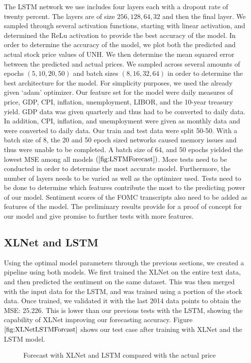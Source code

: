 \documentclass{article}
\begin{document}
The LSTM network we use includes four layers each with a dropout rate of twenty percent. The layers are of size $256,128,64,32$ and then the final layer. We sampled through several activation functions, starting with linear activation, and determined the ReLu activation to provide the best accuracy of the model. In order to determine the accuracy of the model, we plot both the predicted and actual stock price values of UNH. We then determine the mean squared error between the predicted and actual prices. We sampled across several amounts of epochs $(5,10,20,50)$ and batch sizes $(8,16,32, 64)$ in order to determine the best architecture for the model. For simplicity purposes, we used the already given ‘adam’ optimizer. Our feature set for the model were daily measures of price, GDP, CPI, inflation, unemployment, LIBOR, and the 10-year treasury yield. GDP data was given quarterly and thus had to be converted to daily data. In addition, CPI, inflation, and unemployment were given as monthly data and were converted to daily data. Our train and test data were split 50-50.
With a batch size of 8, the 20 and 50 epoch sized networks caused memory issues and thus were unable to be completed. A batch size of 64, and 50 epochs yielded the lowest MSE among all models $(\ref{fig:LSTMForecast})$. More tests need to be conducted in order to determine the most accurate model. Furthermore, the number of layers needs to be varied as well as the optimizer used. Tests need to be done to determine which features contribute the most to the predicting power of our model. Sentiment scores of the FOMC transcripts also need to be added as features of the model. The preliminary results provide for a proof of concept for our model and give promise to further tests with more features.  
\subsection{XLNet and LSTM}
Using the optimal model parameters through the previous sections, we created a pipeline using both models. We first trained the XLNet on the entire text data, and then predicted the sentiment on the same dataset. This was then merged with the input data for the LSTM, and was trained using a portion of the stock data. Once trained, we validated it with the last 2014 data points to obtain the MSE: 25.226. This is lower than our previous tests with the LSTM, showing the capability of XLNet improving our forecasting accuracy. Figure $\ref{fig:XLNetLSTMForcast}$ shows our test case after training with XLNet and the LSTM model. 
\begin{figure}
    \centering
    \scalebox{0.5}{}
    \caption{Forecast with XLNet and LSTM compared with the actual price}
    \label{fig:XLNetLSTMForcast}
\end{figure}
\end{document}
